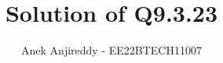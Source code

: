 \documentclass[journal,12pt,twocolumn]{IEEEtran}
\theoremstyle{remark}
\begin{document}
%




\vspace{3cm}

\title{
Solution of Q9.3.23
}
\author{ Anek Anjireddy - EE22BTECH11007
}	


%
%
%

% 
%



% 
\end{document}
